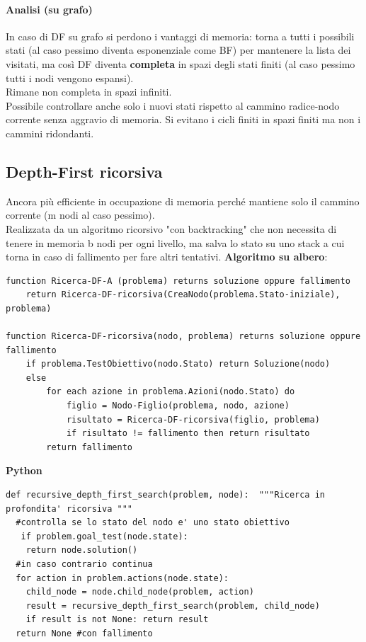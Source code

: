 \documentclass[10pt]{book}
\begin{document}
\paragraph{Analisi (su grafo)} In caso di DF su grafo si perdono i vantaggi di memoria: torna a tutti i possibili stati (al caso pessimo diventa esponenziale come BF) per mantenere la lista dei visitati, ma così DF diventa \textbf{completa} in spazi degli stati finiti (al caso pessimo tutti i nodi vengono espansi).\\
Rimane non completa in spazi infiniti.\\
Possibile controllare anche solo i nuovi stati rispetto al cammino radice-nodo corrente senza aggravio di memoria. Si evitano i cicli finiti in spazi finiti ma non i cammini ridondanti.
\subsection{Depth-First ricorsiva}
Ancora più efficiente in occupazione di memoria perché mantiene solo il cammino corrente (m nodi al caso pessimo).\\
Realizzata da un algoritmo ricorsivo "con backtracking" che non necessita di tenere in memoria b nodi per ogni livello, ma salva lo stato su uno stack a cui torna in caso di fallimento per fare altri tentativi. \textbf{Algoritmo su albero}:
\begin{lstlisting}
function Ricerca-DF-A (problema) returns soluzione oppure fallimento
	return Ricerca-DF-ricorsiva(CreaNodo(problema.Stato-iniziale), problema)
	
function Ricerca-DF-ricorsiva(nodo, problema) returns soluzione oppure fallimento
	if problema.TestObiettivo(nodo.Stato) return Soluzione(nodo)
	else
		for each azione in problema.Azioni(nodo.Stato) do
			figlio = Nodo-Figlio(problema, nodo, azione)
			risultato = Ricerca-DF-ricorsiva(figlio, problema)
			if risultato != fallimento then return risultato
		return fallimento
\end{lstlisting}
\textbf{Python}
\begin{lstlisting}
def recursive_depth_first_search(problem, node):  """Ricerca in profondita' ricorsiva """
  #controlla se lo stato del nodo e' uno stato obiettivo
   if problem.goal_test(node.state):
    return node.solution()
  #in caso contrario continua
  for action in problem.actions(node.state):
    child_node = node.child_node(problem, action)
    result = recursive_depth_first_search(problem, child_node)
    if result is not None: return result
  return None #con fallimento
\end{lstlisting}
\end{document}
